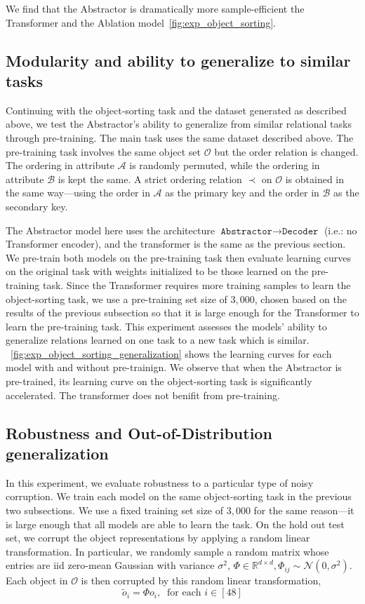 We find that the Abstractor is dramatically more sample-efficient the Transformer and the Ablation model~\cref{fig:exp_object_sorting}.

\subsection{Modularity and ability to generalize to similar tasks}

Continuing with the object-sorting task and the dataset generated as described above, we test the Abstractor's ability to generalize from similar relational tasks through pre-training. The main task uses the same dataset described above. The pre-training task involves the same object set $\mathcal{O}$ but the order relation is changed. The ordering in attribute $\mathcal{A}$ is randomly permuted, while the ordering in attribute $\mathcal{B}$ is kept the same. A strict ordering relation $\prec$ on $\mathcal{O}$ is obtained in the same way---using the order in $\mathcal{A}$ as the primary key and the order in $\mathcal{B}$ as the secondary key.

The Abstractor model here uses the architecture $\texttt{Abstractor} \to \texttt{Decoder}$ (i.e.: no Transformer encoder), and the transformer is the same as the previous section. We pre-train both models on the pre-training task then evaluate learning curves on the original task with weights initialized to be those learned on the pre-training task. Since the Transformer requires more training samples to learn the object-sorting task, we use a pre-training set size of $3,000$, chosen based on the results of the previous subsection so that it is large enough for the Transformer to learn the pre-training task. This experiment assesses the models' ability to generalize relations learned on one task to a new task which is similar. ~\cref{fig:exp_object_sorting_generalization} shows the learning curves for each model with and without pre-trainign. We observe that when the Abstractor is pre-trained, its learning curve on the object-sorting task is significantly accelerated. The transformer does not benifit from pre-training.

\subsection{Robustness and Out-of-Distribution generalization}
In this experiment, we evaluate robustness to a particular type of noisy corruption. We train each model on the same object-sorting task in the previous two subsections. We use a fixed training set size of $3,000$ for the same reason---it is large enough that all models are able to learn the task. On the hold out test set, we corrupt the object representations by applying a random linear transformation. In particular, we randomly sample a random matrix whose entries are iid zero-mean Gaussian with variance $\sigma^2$, $\Phi \in \mathbb{R}^{d \times d}, \Phi_{ij} \sim \mathcal{N}(0, \sigma^2)$. Each object in $\mathcal{O}$ is then corrupted by this random linear transformation,
\[\tilde{o}_i = \Phi o_i, \ \text{ for each } i \in [48]\]

